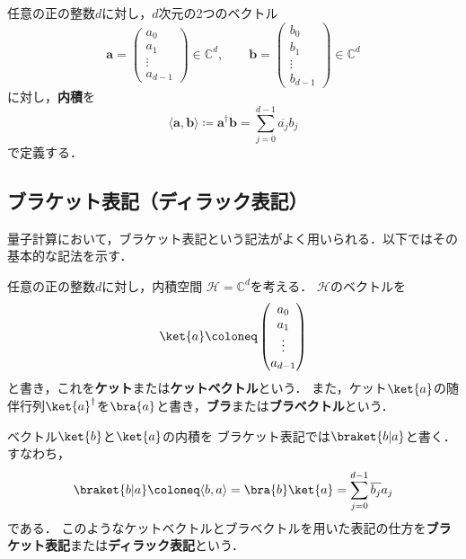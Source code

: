 \begin{samepage}
  \begin{defi}[内積]
    任意の正の整数$d$に対し，$d$次元の2つのベクトル
    \begin{equation*}
      \bm{a}=\begin{pmatrix}a_0\\a_1\\\vdots\\a_{d-1}\end{pmatrix}
      \in\mathbb C^d,
      \qquad
      \bm{b}=\begin{pmatrix}b_0\\b_1\\\vdots\\b_{d-1}\end{pmatrix}
      \in\mathbb C^d
    \end{equation*}
    に対し，\textbf{内積}を
    \begin{equation*}
      \langle \bm{a},\bm{b}\rangle\coloneq \bm{a}^{\dagger}\bm{b}
      =\sum_{j=0}^{d-1}\overline{a_j}b_j
    \end{equation*}
    で定義する．
  \end{defi}
\end{samepage}

\subsection{ブラケット表記（ディラック表記）}

量子計算において，ブラケット表記という記法がよく用いられる．以下ではその基本的な記法を示す．

\begin{defi}
  任意の正の整数$d$に対し，内積空間
  $\mathcal H=\mathbb C^d$を考える．
  $\mathcal H$のベクトルを
  \begin{equation*}
    \ket{a}
    \coloneq
    \begin{pmatrix}
      a_0 \\a_1\\\vdots\\a_{d-1}
    \end{pmatrix}
  \end{equation*}
  と書き，これを\textbf{ケット}または\textbf{ケットベクトル}という．
  また，ケット$\ket{a}$の随伴行列$\ket{a}^{\dagger}$を$\bra{a}$と書き，\textbf{ブラ}または\textbf{ブラベクトル}という．

  ベクトル$\ket{b}$と$\ket{a}$の内積を
  ブラケット表記では$\braket{b|a}$と書く．すなわち，
  \begin{equation*}
    \braket{b|a}\coloneq\langle b,a\rangle
    =\bra{b}\ket{a}
    =\sum_{j=0}^{d-1}\overline{b_j}a_j
  \end{equation*}
  である．
  このようなケットベクトルとブラベクトルを用いた表記の仕方を\textbf{ブラケット表記}または\textbf{ディラック表記}という．
\end{defi}

